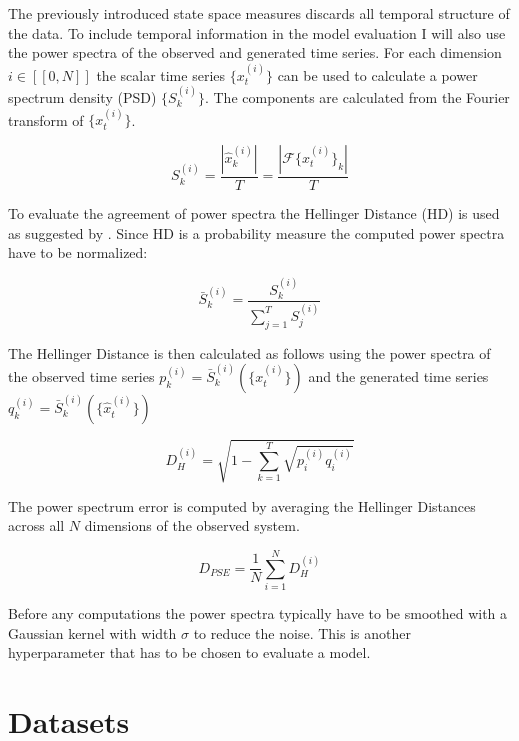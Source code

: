 The previously introduced state space measures discards all temporal structure of the data. To include temporal information in the model evaluation I will also use the 
power spectra of the observed and generated time series. For each dimension $i \in [\![0, N]\!]$ the scalar time series $\{x^{(i)}_t\}$ can be used to 
calculate a power spectrum density (PSD) $\{S^{(i)}_k\}$. The components are calculated from the Fourier transform of $\{x^{(i)}_t\}$.

\begin{equation}
    S_k^{(i)} = \frac{|\widehat{x}^{(i)}_k|}{T} = \frac{| \mathscr{F}\{x^{(i)}_t\}_k |}{T}
\end{equation}

To evaluate the agreement of power spectra the Hellinger Distance (HD) is used as suggested by \cite{mikhaeil2022difficulty}. Since HD is a probability measure 
the computed power spectra have to be normalized:

\begin{equation}
    \bar{S}^{(i)}_k = \frac{S^{(i)}_k}{\sum_{j=1}^{T}S^{(i)}_j}
\end{equation}

The Hellinger Distance is then calculated as follows using the power spectra of the observed time series  $p^{(i)}_k = \bar{S}^{(i)}_k(\{x^{(i)}_t\})$ and 
the generated time series $q^{(i)}_k = \bar{S}^{(i)}_k (\{\hat{x}^{(i)}_t\})$

\begin{equation}
    D_H^{(i)} = \sqrt{1 - \sum_{k = 1}^{T}\sqrt{p^{(i)}_i q^{(i)}_i}}
    \label{eq:hellinger_dist}
\end{equation}

The power spectrum error is computed by averaging the Hellinger Distances across all $N$ dimensions of the observed system.

\begin{equation}
    D_{PSE} = \frac{1}{N} \sum_{i = 1}^{N} D_H^{(i)}
    \label{eq:d_pse}
\end{equation}

Before any computations the power spectra typically have to be smoothed with a Gaussian kernel with width $\sigma$ to reduce the noise. This is another 
hyperparameter that has to be chosen to evaluate a model.

\section{Datasets}


